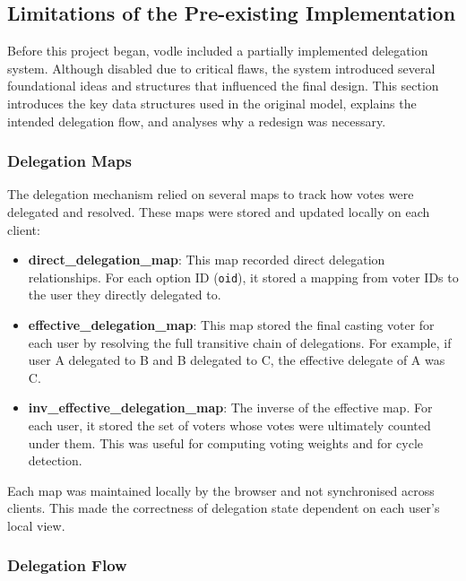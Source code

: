 \subsection{Limitations of the Pre-existing Implementation}

Before this project began, vodle included a partially implemented delegation system. Although disabled due to critical flaws, the system introduced several foundational ideas and structures that influenced the final design. This section introduces the key data structures used in the original model, explains the intended delegation flow, and analyses why a redesign was necessary.

\subsubsection*{Delegation Maps}

The delegation mechanism relied on several maps to track how votes were delegated and resolved. These maps were stored and updated locally on each client:

\begin{itemize}
    \item \textbf{direct\_delegation\_map}: This map recorded direct delegation relationships. For each option ID (\texttt{oid}), it stored a mapping from voter IDs to the user they directly delegated to.

    \item \textbf{effective\_delegation\_map}: This map stored the final casting voter for each user by resolving the full transitive chain of delegations. For example, if user A delegated to B and B delegated to C, the effective delegate of A was C.

    \item \textbf{inv\_effective\_delegation\_map}: The inverse of the effective map. For each user, it stored the set of voters whose votes were ultimately counted under them. This was useful for computing voting weights and for cycle detection.
\end{itemize}

Each map was maintained locally by the browser and not synchronised across clients. This made the correctness of delegation state dependent on each user's local view.

\subsubsection*{Delegation Flow}

